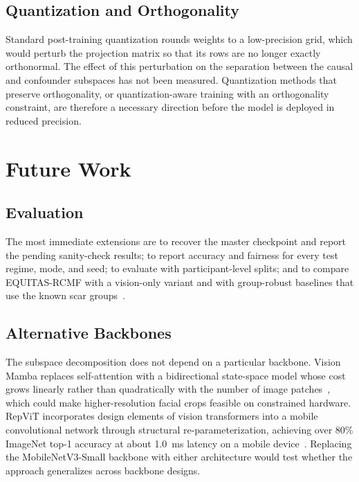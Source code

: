 \subsection{Quantization and Orthogonality}
Standard post-training quantization rounds weights to a low-precision grid, which would perturb the projection matrix so that its rows are no longer exactly orthonormal. The effect of this perturbation on the separation between the causal and confounder subspaces has not been measured. Quantization methods that preserve orthogonality, or quantization-aware training with an orthogonality constraint, are therefore a necessary direction before the model is deployed in reduced precision.

\section{Future Work}
\subsection{Evaluation}
The most immediate extensions are to recover the master checkpoint and report the pending sanity-check results; to report accuracy and fairness for every test regime, mode, and seed; to evaluate with participant-level splits; and to compare EQUITAS-RCMF with a vision-only variant and with group-robust baselines that use the known scar groups~\cite{sagawa2020}.

\subsection{Alternative Backbones}
The subspace decomposition does not depend on a particular backbone. Vision Mamba replaces self-attention with a bidirectional state-space model whose cost grows linearly rather than quadratically with the number of image patches~\cite{zhu2024vim}, which could make higher-resolution facial crops feasible on constrained hardware. RepViT incorporates design elements of vision transformers into a mobile convolutional network through structural re-parameterization, achieving over 80\% ImageNet top-1 accuracy at about 1.0~ms latency on a mobile device~\cite{wang2024repvit}. Replacing the MobileNetV3-Small backbone with either architecture would test whether the approach generalizes across backbone designs.

